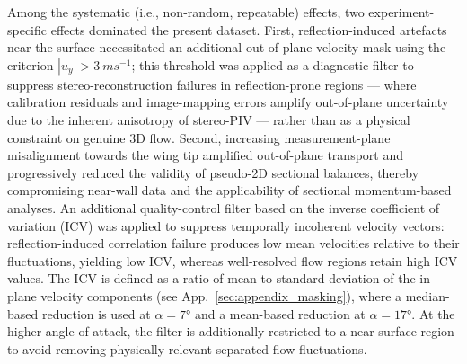\documentclass[wes, manuscript]{copernicus}
\begin{document}
Among the systematic (i.e., non-random, repeatable) effects, two experiment-specific effects dominated the present dataset. First, reflection-induced artefacts near the surface necessitated an additional out-of-plane velocity mask using the criterion $|u_y|>3~\unit{m s^{-1}}$; this threshold was applied as a diagnostic filter to suppress stereo-reconstruction failures in reflection-prone regions — where calibration residuals and image-mapping errors amplify out-of-plane uncertainty due to the inherent anisotropy of stereo-PIV \citep{sciacchitano2016} — rather than as a physical constraint on genuine 3D flow. Second, increasing measurement-plane misalignment towards the wing tip amplified out-of-plane transport and progressively reduced the validity of pseudo-2D sectional balances, thereby compromising near-wall data and the applicability of sectional momentum-based analyses. An additional quality-control filter based on the inverse coefficient of variation (ICV) was applied to suppress temporally incoherent velocity vectors: reflection-induced correlation failure produces low mean velocities relative to their fluctuations, yielding low ICV, whereas well-resolved flow regions retain high ICV values. 
The ICV is defined as a ratio of mean to standard deviation of the in-plane velocity components (see App.~\ref{sec:appendix_masking}), where a median-based reduction is used at $\alpha = 7\unit{\degree}$ and a mean-based reduction at $\alpha = 17\unit{\degree}$. At the higher angle of attack, the filter is additionally restricted to a near-surface region to avoid removing physically relevant separated-flow fluctuations.
\end{document}
